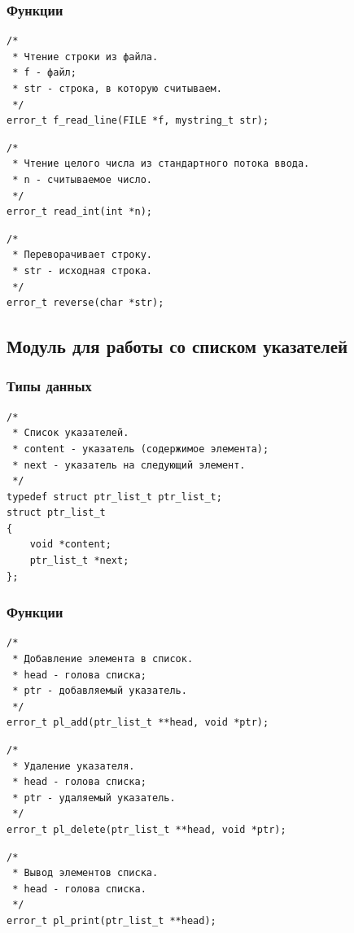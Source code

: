 \documentclass[a4paper,12pt]{extarticle}
\begin{document}
\subsubsection{Функции}
\begin{verbatim}
/*
 * Чтение строки из файла.
 * f - файл;
 * str - строка, в которую считываем.
 */
error_t f_read_line(FILE *f, mystring_t str);
\end{verbatim}

\begin{verbatim}
/*
 * Чтение целого числа из стандартного потока ввода.
 * n - считываемое число.
 */
error_t read_int(int *n);
\end{verbatim}

\begin{verbatim}
/*
 * Переворачивает строку.
 * str - исходная строка.
 */
error_t reverse(char *str);
\end{verbatim}

\subsection{Модуль для работы со списком указателей}
\subsubsection{Типы данных}
\begin{verbatim}
/*
 * Список указателей.
 * content - указатель (содержимое элемента);
 * next - указатель на следующий элемент.
 */
typedef struct ptr_list_t ptr_list_t;
struct ptr_list_t
{
    void *content;
    ptr_list_t *next;
};
\end{verbatim}

\subsubsection{Функции}
\begin{verbatim}
/*
 * Добавление элемента в список.
 * head - голова списка;
 * ptr - добавляемый указатель.
 */
error_t pl_add(ptr_list_t **head, void *ptr);
\end{verbatim}

\begin{verbatim}
/*
 * Удаление указателя.
 * head - голова списка;
 * ptr - удаляемый указатель.
 */
error_t pl_delete(ptr_list_t **head, void *ptr);
\end{verbatim}

\begin{verbatim}
/*
 * Вывод элементов списка.
 * head - голова списка.
 */
error_t pl_print(ptr_list_t **head);
\end{verbatim}
\end{document}
